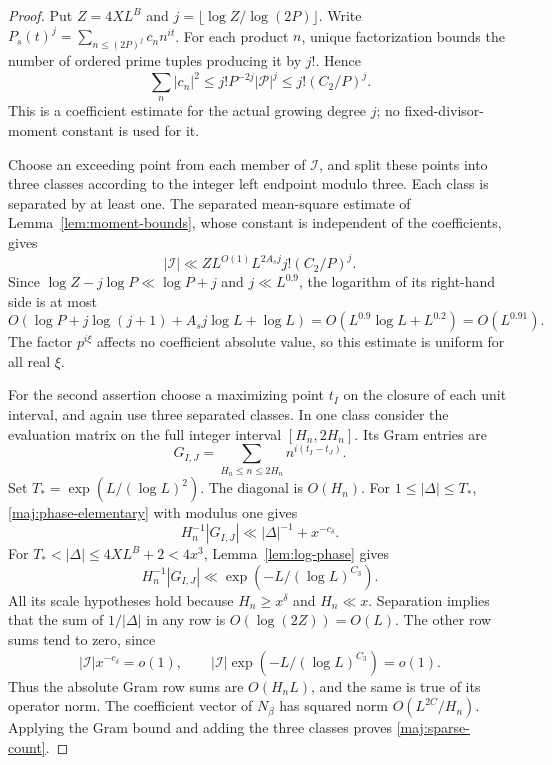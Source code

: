 \begin{proof}
Put $Z=4XL^B$ and $j=\lfloor\log Z/\log(2P)\rfloor$.
Write $P_s(t)^j=\sum_{n\le(2P)^j}c_nn^{it}$.
For each product $n$, unique factorization bounds the number of
ordered prime tuples producing it by $j!$.  Hence
\begin{equation}\label{maj:factorial-norm}
 \sum_n|c_n|^2
 \le j!P^{-2j}|\mathcal P|^j
 \le j!(C_2/P)^j.
\end{equation}
This is a coefficient estimate for the actual growing degree $j$;
no fixed-divisor-moment constant is used for it.

Choose an exceeding point from each member of $\mathcal I$, and
split these points into three classes according to the integer
left endpoint modulo three.  Each class is separated by at least
one.  The separated mean-square estimate of
Lemma~\ref{lem:moment-bounds}, whose constant is independent of
the coefficients, gives
\begin{equation}\label{maj:exception-count-calculation}
 |\mathcal I|
 \ll ZL^{O(1)}L^{2A_sj}j!(C_2/P)^j.
\end{equation}
Since $\log Z-j\log P\ll\log P+j$ and
$j\ll L^{0.9}$, the logarithm of its right-hand side is at most
\[
 O(\log P+j\log(j+1)+A_sj\log L+\log L)
       =O(L^{0.9}\log L+L^{0.2})=O(L^{0.91}).
\]
The factor $p^{i\xi}$ affects no coefficient absolute value, so
this estimate is uniform for all real $\xi$.

For the second assertion choose a maximizing point $t_I$ on the
closure of each unit interval, and again use three separated
classes.  In one class consider the evaluation matrix on the full
integer interval $[H_n,2H_n]$.  Its Gram entries are
\[
 G_{I,J}=\sum_{H_n\le n\le2H_n}n^{i(t_I-t_J)}.
\]
Set $T_*=\exp(L/(\log L)^2)$.  The diagonal is $O(H_n)$.
For $1\le|\Delta|\le T_*$,
\eqref{maj:phase-elementary} with modulus one gives
\begin{equation}\label{maj:Gram-near}
 H_n^{-1}|G_{I,J}|\ll |\Delta|^{-1}+x^{-c_\delta}.
\end{equation}
For $T_*<|\Delta|\le 4XL^B+2<4x^3$,
Lemma~\ref{lem:log-phase} gives
\begin{equation}\label{maj:Gram-far}
 H_n^{-1}|G_{I,J}|
 \ll\exp(-L/(\log L)^{C_3}).
\end{equation}
All its scale hypotheses hold because $H_n\ge x^\delta$ and
$H_n\ll x$.  Separation implies that the sum of $1/|\Delta|$
in any row is $O(\log(2Z))=O(L)$.
The other row sums tend to zero, since
\[
 |\mathcal I|x^{-c_\delta}=o(1),\qquad
 |\mathcal I|\exp(-L/(\log L)^{C_3})=o(1).
\]
Thus the absolute Gram row sums are $O(H_nL)$, and the same is
true of its operator norm.  The coefficient vector of $N_\beta$
has squared norm $O(L^{2C}/H_n)$.  Applying the Gram bound and
adding the three classes proves \eqref{maj:sparse-count}.
\end{proof}

